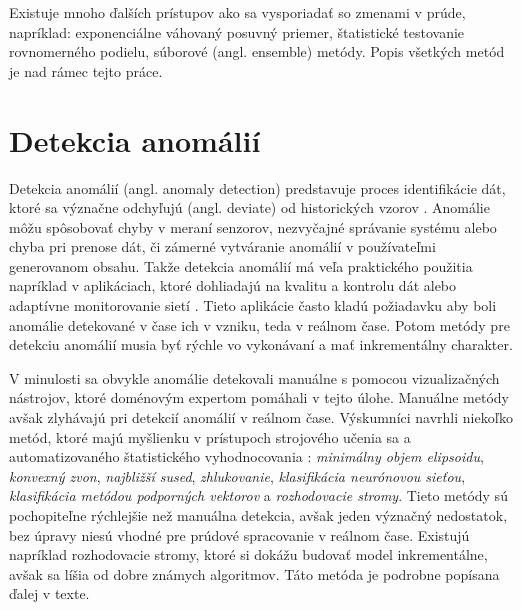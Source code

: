 \par
Existuje mnoho ďalších prístupov ako sa vysporiadať so zmenami v prúde, napríklad: exponenciálne váhovaný posuvný priemer, štatistické testovanie rovnomerného podielu, súborové (angl. ensemble) metódy. Popis všetkých metód je nad rámec tejto práce.



\section{Detekcia anomálií}
Detekcia anomálií (angl. anomaly detection) predstavuje proces identifikácie dát, ktoré sa význačne odchyľujú (angl. deviate) od historických vzorov \citep{hodge2004survey}. Anomálie môžu spôsobovať chyby v meraní senzorov, nezvyčajné správanie systému alebo chyba pri prenose dát, či zámerné vytváranie anomálií v používateľmi generovanom obsahu. 
Takže detekcia anomálií má veľa praktického použitia napríklad v aplikáciach, ktoré dohliadajú na kvalitu a kontrolu dát \citep{hill2007real} alebo adaptívne monitorovanie sietí  \citep{hill2010anomaly}. Tieto aplikácie často kladú požiadavku aby boli anomálie detekované v čase ich v vzniku, teda v reálnom čase. Potom metódy pre detekciu anomálií musia byť rýchle vo vykonávaní a mať inkrementálny charakter. \par

V minulosti sa obvykle anomálie detekovali manuálne s pomocou vizualizačných nástrojov, ktoré doménovým expertom pomáhali v tejto úlohe. Manuálne metódy avšak zlyhávajú pri detekcií anomálií v reálnom čase. Výskumníci navrhli niekoľko metód, ktoré majú myšlienku v prístupoch strojového učenia sa a automatizovaného štatistického vyhodnocovania \citep{hill2010anomaly}: \textit{minimálny objem elipsoidu}, \textit{konvexný zvon}, \textit{najbližší sused}, \textit{zhlukovanie}, \textit{klasifikácia neurónovou sieťou}, \textit{klasifikácia metódou podporných vektorov} a \textit{rozhodovacie stromy}. Tieto metódy sú pochopiteľne rýchlejšie než manuálna detekcia, avšak jeden význačný nedostatok, bez úpravy niesú vhodné pre prúdové spracovanie v reálnom čase. Existujú napríklad rozhodovacie stromy, ktoré si dokážu budovať model inkrementálne, avšak sa líšia od dobre známych algoritmov. Táto metóda je podrobne popísana ďalej v texte.

